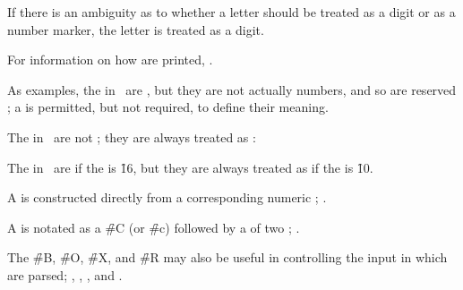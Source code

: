 If there is an ambiguity as to whether
a letter should be treated as a digit or as a number marker,
the letter is treated as a digit.

For information on how  are printed, 
\seesection\PrintingPotentialNumbers.


As examples, the  in \thenextfigure\ are ,
but they are not actually numbers, and so are reserved ;
a  is permitted, but not required,
to define their meaning.



The  in \thenextfigure\ are not ; 
they are always treated as :

                                  
The  in \thenextfigure\ are 
if the  is \f{16}, 
but they are always treated as  if the  is \f{10}. 


\endsubsubsubsection%

\endsubsubsection%

\endsubsection%


A  is constructed directly from a corresponding numeric ;
\seefigure\SyntaxForNumericTokens.

A  is notated as a \f{\#C} (or \f{\#c}) followed by a 
of two ; \seesection\SharpsignC.

The  \f{\#B}, \f{\#O}, \f{\#X}, and \f{\#R} may also be useful
in controlling the input  in which  are parsed;
 \seesection\SharpsignB,
     \secref\SharpsignO,
     \secref\SharpsignX,
 and \secref\SharpsignR.

